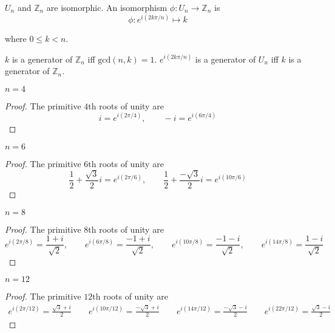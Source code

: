 $U_{n}$ and $\mathbb{Z}_{n}$ are isomorphic. An isomorphism $\phi: U_{n} \to \mathbb{Z}_{n}$ is
\[
    \phi: e^{i(2k\pi/n)} \mapsto k
\]

where $0\leq k < n$.

$k$ is a generator of $\mathbb{Z}_{n}$ iff $\text{gcd}(n, k) = 1$. $e^{i(2k\pi/n)}$ is a generator of $U_{n}$ iff $k$ is a generator of $\mathbb{Z}_{n}$.

\newpage
\begin{exercise}
    $n = 4$
\end{exercise}

\begin{proof}
    The primitive $4$th roots of unity are
    \[
        i = e^{i(2\pi/4)},\qquad -i = e^{i(6\pi/4)}
    \]
\end{proof}

\newpage
\begin{exercise}
    $n = 6$
\end{exercise}

\begin{proof}
    The primitive $6$th roots of unity are
    \[
        \frac{1}{2} + \frac{\sqrt{3}}{2}i = e^{i(2\pi/6)},\qquad \frac{1}{2} + \frac{-\sqrt{3}}{2}i = e^{i(10\pi/6)}
    \]
\end{proof}

\newpage
\begin{exercise}
    $n = 8$
\end{exercise}

\begin{proof}
    The primitive $8$th roots of unity are
    \[
        e^{i(2\pi/8)} = \frac{1 + i}{\sqrt{2}},\qquad e^{i(6\pi/8)} = \frac{-1+i}{\sqrt{2}},\qquad e^{i(10\pi/8)} = \frac{-1-i}{\sqrt{2}},\qquad e^{i(14\pi/8)} = \frac{1-i}{\sqrt{2}}
    \]
\end{proof}

\newpage
\begin{exercise}
    $n = 12$
\end{exercise}

\begin{proof}
    The primitive $12$th roots of unity are
    \[
        \begin{split}
            e^{i(2\pi/12)} = \frac{\sqrt{3} + i}{2} \qquad e^{i(10\pi/12)} = \frac{-\sqrt{3} + i}{2}\qquad e^{i(14\pi/12)} = \frac{-\sqrt{3} - i}{2} \qquad e^{i(22\pi/12)} = \frac{\sqrt{3} - i}{2}
        \end{split}
    \]
\end{proof}

